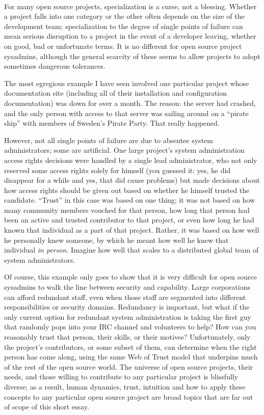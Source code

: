 \paragraph*{}For many open source projects, specialization is a curse, not a blessing.
Whether a project falls into one category or the other often depends on the size
of the development team; specialization to the degree of single points of
failure can mean serious disruption to a project in the event of a developer
leaving, whether on good, bad or unfortunate terms. It is no different for open
source project sysadmins, although the general scarcity of these seems to allow
projects to adopt sometimes dangerous tolerances.

The most egregious example I have seen involved one particular project whose
documentation site (including all of their installation and configuration
documentation) was down for over a month. The reason: the server had crashed,
and the only person with access to that server was sailing around on a ``pirate
ship'' with members of Sweden’s Pirate Party. That really happened.

However, not all single points of failure are due to absentee system
administrators; some are artificial. One large project’s system administration
access rights decisions were handled by a single lead administrator, who not
only reserved some access rights solely for himself (you guessed it: yes, he did disappear for a
while and yes, that did cause problems) but made decisions about how access
rights should be given out based on whether he himself trusted the candidate.
``Trust'' in this case was based on one thing; it was not based on how many
community members vouched for that person, how long that person had been an
active and trusted contributor to that project, or even how long he had known
that individual as a part of that project. Rather, it was based on how well he
personally knew someone, by which he meant how well he knew that individual \emph{in
person}. Imagine how well that scales to a distributed global team of system
administrators.

Of course, this example only goes to show that it is very difficult for open
source sysadmins to walk the line between security and capability. Large
corporations can afford redundant staff, even when those staff are segmented
into different responsibilities or security domains. Redundancy is important,
but what if the only current option for redundant system administration is
taking the first guy that randomly pops into your IRC channel and volunteers to
help? How can you reasonably trust that person, their skills, or their motives?
Unfortunately, only the project’s contributors, or some subset of them, can
determine when the right person has come along, using the same Web of Trust model
that underpins much of the rest of the open source world. The universe of open source
projects, their needs, and those willing to contribute to any particular project
is blissfully diverse; as a result, human dynamics, trust, intuition and how to
apply these concepts to any particular open source project are broad topics that are far
out of scope of this short essay.

